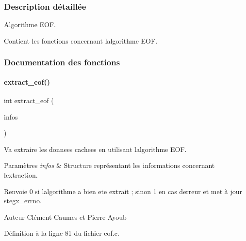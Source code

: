 \subsubsection{Description détaillée}
Algorithme E\+OF. 

Contient les fonctions concernant l\textquotesingle{}algorithme E\+OF. 

\subsubsection{Documentation des fonctions}
\mbox{\label{a00020_a0204ccf62793e17621fea9abae71e9da}} 
\paragraph{\texorpdfstring{extract\+\_\+eof()}{extract\_eof()}}
{\footnotesize\ttfamily int extract\+\_\+eof (\begin{DoxyParamCaption}\item[{\hyperlink{a00008_aa8ca908d92fb5bdd3c0a9e1f58b2cf03}{info\+\_\+s} $\ast$}]{infos }\end{DoxyParamCaption})}



Va extraire les donnees cachees en utilisant l\textquotesingle{}algorithme E\+OF. 


\begin{DoxyParams}{Paramètres}
{\em infos} & Structure représentant les informations concernant l\textquotesingle{}extraction. \\
\hline
\end{DoxyParams}
\begin{DoxyReturn}{Renvoie}
0 si l\textquotesingle{}algorithme a bien ete extrait ; sinon 1 en cas d\textquotesingle{}erreur et met à jour \hyperlink{a00062_a5ec48ccdfbe19fe23855818f8556abec}{stegx\+\_\+errno}. 
\end{DoxyReturn}
\begin{DoxyAuthor}{Auteur}
Clément Caumes et Pierre Ayoub 
\end{DoxyAuthor}


Définition à la ligne 81 du fichier eof.\+c.

